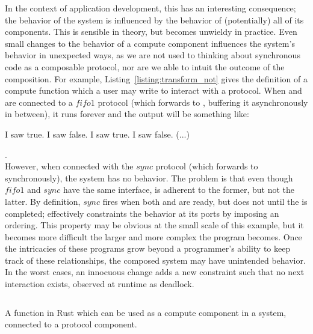 In the context of application development, this has an interesting consequence; the behavior of the system is influenced by the behavior of (potentially) all of its components. This is sensible in theory, but becomes unwieldy in practice. Even small changes to the behavior of a compute component influences the system's behavior in unexpected ways, as we are not used to thinking about synchronous code as a composable protocol, nor are we able to intuit the outcome of the composition. For example, Listing~\ref{listing:transform_not} gives the definition of a compute function which a user may write to interact with a protocol. When  and  are connected to a $fifo1$ protocol (which forwards  to , buffering it asynchronously in between), it runs forever and the output will be something like:
\begin{verb}
	I saw true. I saw false. I saw true. I saw false. (...)
\end{verb}.\\However, when connected with the $sync$ protocol (which forwards  to  synchronously), the system has no behavior. The problem is that even though $fifo1$ and $sync$ have the same interface,  is adherent to the former, but not the latter. By definition, $sync$ fires when both  and  are ready, but  does not  until the  is completed; effectively  constraints the behavior at its ports by imposing an ordering. This property may be obvious at the small scale of this example, but it becomes more difficult the larger and more complex the program becomes. Once the intricacies of these programs grow beyond a programmer's ability to keep track of these relationships, the composed system may have unintended behavior. In the worst cases, an innocuous change adds a new constraint such that no next interaction exists, observed at runtime as deadlock. 


\begin{listing}[ht]
	\inputminted[]{rust}{transform_not.rs}
	\caption[Rust example of a compute component.]{A function in Rust which can be used as a compute component in a system, connected to a protocol component.}
	\label{listing:transform_not}
\end{listing}


